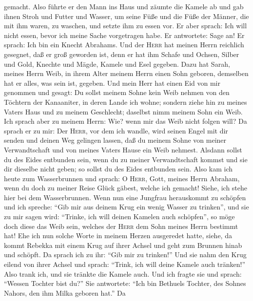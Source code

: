 gemacht.  Also führte er den Mann ins Haus und zäumte die
Kamele ab und gab ihnen Stroh und Futter und Wasser, um seine Füße und
die Füße der Männer, die mit ihm waren, zu waschen,  und
setzte ihm zu essen vor. Er aber sprach: Ich will nicht essen, bevor ich
meine Sache vorgetragen habe. Er antwortete: Sage an!  Er
sprach: Ich bin ein Knecht Abrahams.  Und der
\textsc{Herr} hat meinen Herrn reichlich gesegnet, daß er groß geworden
ist, denn er hat ihm Schafe und Ochsen, Silber und Gold, Knechte und
Mägde, Kamele und Esel gegeben.  Dazu hat Sarah, meines
Herrn Weib, in ihrem Alter meinem Herrn einen Sohn geboren, demselben
hat er alles, was sein ist, gegeben.  Und mein Herr hat
einen Eid von mir genommen und gesagt: Du sollst meinem Sohne kein Weib
nehmen von den Töchtern der Kanaaniter, in deren Lande ich wohne;
 sondern ziehe hin zu meines Vaters Haus und zu meinem
Geschlecht; daselbst nimm meinem Sohn ein Weib.  Ich
sprach aber zu meinem Herrn: Wie? wenn mir das Weib nicht folgen will?
 Da sprach er zu mir: Der \textsc{Herr}, vor dem ich
wandle, wird seinen Engel mit dir senden und deinen Weg gelingen lassen,
daß du meinem Sohne von meiner Verwandtschaft und von meines Vaters
Hause ein Weib nehmest.  Alsdann sollst du des Eides
entbunden sein, wenn du zu meiner Verwandtschaft kommst und sie dir
dieselbe nicht geben; so sollst du des Eides entbunden sein.
 Also kam ich heute zum Wasserbrunnen und sprach: O
\textsc{Herr}, Gott, meines Herrn Abraham, wenn du doch zu meiner Reise
Glück gäbest, welche ich gemacht!  Siehe, ich stehe hier
bei dem Wasserbrunnen. Wenn nun eine Jungfrau herauskommt zu schöpfen
und ich spreche: ``Gib mir aus deinem Krug ein wenig Wasser zu
trinken'',  und sie zu mir sagen wird: ``Trinke, ich will
deinen Kamelen auch schöpfen'', so möge doch diese das Weib sein,
welches der \textsc{Herr} dem Sohn meines Herrn bestimmt hat!
 Ehe ich nun solche Worte in meinem Herzen ausgeredet
hatte, siehe, da kommt Rebekka mit einem Krug auf ihrer Achsel und geht
zum Brunnen hinab und schöpft. Da sprach ich zu ihr: ``Gib mir zu
trinken!''  Und sie nahm den Krug eilend von ihrer Achsel
und sprach: ``Trink, ich will deine Kamele auch tränken!'' Also trank
ich, und sie tränkte die Kamele auch.  Und ich fragte sie
und sprach: ``Wessen Tochter bist du?'' Sie antwortete: ``Ich bin
Bethuels Tochter, des Sohnes Nahors, den ihm Milka geboren hat.'' Da
